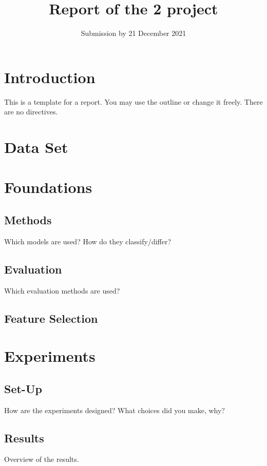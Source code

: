 \documentclass[a4paper,12pt]{article}
\title{Report of the 2\ts{nd} project}
\date{Submission by 21\ts{st} December 2021}
\begin{document}

    
\maketitle


\section{Introduction}
This is a template for a report. You may use the outline or change it freely. There are no directives.

\section{Data Set}

\section{Foundations}

\subsection{Methods}
Which models are used? How do they classify/differ? 

\subsection{Evaluation}
Which evaluation methods are used?

\subsection{Feature Selection}

\section{Experiments}

\subsection{Set-Up}
How are the experiments designed? What choices did you make, why?

\subsection{Results}
Overview of the results.
\end{document}
